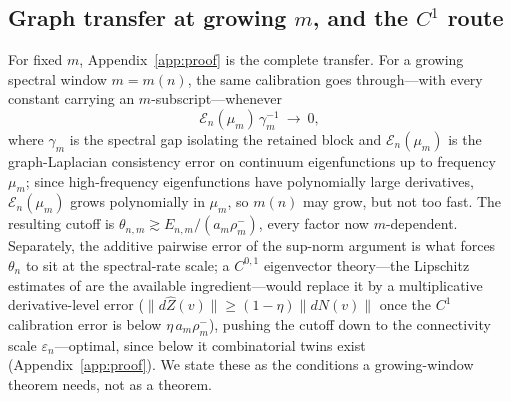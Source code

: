 \documentclass[11pt]{article}
\theoremstyle{remark}
\begin{document}
\subsection*{Graph transfer at growing $m$, and the $C^1$ route}
For fixed $m$, Appendix~\ref{app:proof} is the complete transfer. For a
growing spectral window $m=m(n)$, the same calibration goes through---with
every constant carrying an $m$-subscript---whenever
\[
\mathcal E_n(\mu_m)\,\gamma_m^{-1}\ \longrightarrow\ 0,
\]
where $\gamma_m$ is the spectral gap isolating the retained block and
$\mathcal E_n(\mu_m)$ is the graph-Laplacian consistency error on continuum
eigenfunctions up to frequency $\mu_m$; since high-frequency eigenfunctions
have polynomially large derivatives, $\mathcal E_n(\mu_m)$ grows polynomially
in $\mu_m$, so $m(n)$ may grow, but not too fast. The resulting cutoff is
$\theta_{n,m}\gtrsim E_{n,m}/(a_m\rho^-_m)$, every factor now
$m$-dependent. Separately, the additive pairwise error of the sup-norm
argument is what forces $\theta_n$ to sit at the spectral-rate scale; a
$C^{0,1}$ eigenvector theory---the Lipschitz estimates of
\cite{calderlewicka2022} are the available ingredient---would replace it by a
multiplicative derivative-level error ($\lVert d\hat Z(v)\rVert\ge
(1-\eta)\lVert dN(v)\rVert$ once the $C^1$ calibration error is below
$\eta\,a_m\rho^-_m$), pushing the cutoff down to the connectivity scale
$\varepsilon_n$---optimal, since below it combinatorial twins exist
(Appendix~\ref{app:proof}). We state these as the conditions a growing-window
theorem needs, not as a theorem.
\end{document}
